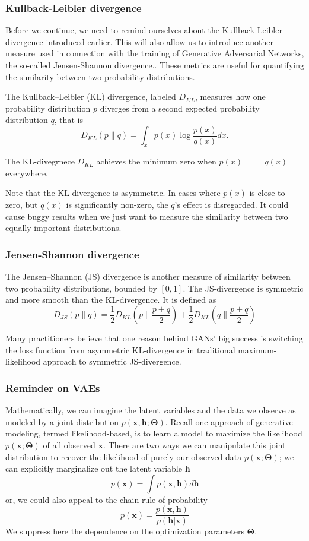 \documentclass{beamer}
\begin{document}
\begin{frame}
\frametitle{Kullback-Leibler divergence}

Before we continue, we need to remind ourselves about the
Kullback-Leibler divergence introduced earlier. This will also allow
us to introduce another measure used in connection with the training
of Generative Adversarial Networks, the so-called Jensen-Shannon divergence..
These metrics are useful for quantifying the similarity between two probability distributions.

The Kullback–Leibler (KL) divergence, labeled $D_{KL}$,   measures how one probability distribution $p$ diverges from a second expected probability distribution $q$,
that is
\[
D_{KL}(p \| q) = \int_x p(x) \log \frac{p(x)}{q(x)} dx.
\]

The KL-divegrnece $D_{KL}$ achieves the minimum zero when $p(x) == q(x)$ everywhere.

Note that the KL divergence is asymmetric. In cases where $p(x)$ is
close to zero, but $q(x)$ is significantly non-zero, the $q$'s effect
is disregarded. It could cause buggy results when we just want to
measure the similarity between two equally important distributions.
\end{frame}

\begin{frame}
\frametitle{Jensen-Shannon divergence}

The Jensen–Shannon (JS) divergence is another measure of similarity between
two probability distributions, bounded by $[0, 1]$. The JS-divergence is
symmetric and more smooth than the KL-divergence.
It is defined as
\[
D_{JS}(p \| q) = \frac{1}{2} D_{KL}(p \| \frac{p + q}{2}) + \frac{1}{2} D_{KL}(q \| \frac{p + q}{2})
\]

Many practitioners believe that one reason behind GANs' big success is
switching the loss function from asymmetric KL-divergence in
traditional maximum-likelihood approach to symmetric JS-divergence.
\end{frame}

\begin{frame}
\frametitle{Reminder on VAEs}

Mathematically, we can imagine the latent variables and the data we
observe as modeled by a joint distribution $p(\bm{x}, \bm{h};\bm{\Theta})$.  Recall one
approach of generative modeling, termed likelihood-based, is to
learn a model to maximize the likelihood $p(\bm{x};\bm{\Theta})$ of all observed
$\bm{x}$.  There are two ways we can manipulate this joint distribution
to recover the likelihood of purely our observed data $p(\bm{x};\bm{\Theta})$; we can
explicitly marginalize
out the latent variable $\bm{h}$
\begin{equation*}
p(\bm{x}) = \int p(\bm{x}, \bm{h})d\bm{h}
\end{equation*}
or, we could also appeal to the chain rule of probability
\begin{equation*}
p(\bm{x}) = \frac{p(\bm{x}, \bm{h})}{p(\bm{h}|\bm{x})}
\end{equation*}
We suppress here the dependence	on the optimization parameters $\bm{\Theta}$.
\end{frame}
\end{document}
